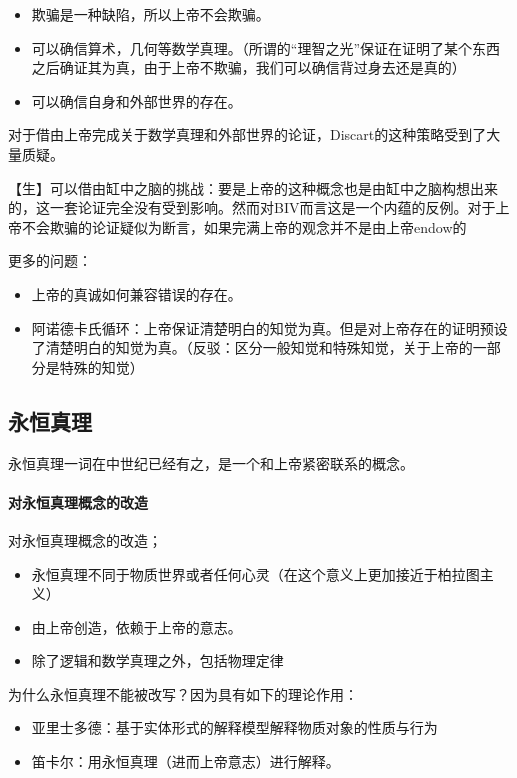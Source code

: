 \documentclass{ctexart}
\begin{document}
\begin{itemize}
    \item 欺骗是一种缺陷，所以上帝不会欺骗。
    \item 可以确信算术，几何等数学真理。（所谓的“理智之光”保证在证明了某个东西之后确证其为真，由于上帝不欺骗，我们可以确信背过身去还是真的）
    \item 可以确信自身和外部世界的存在。
\end{itemize}

对于借由上帝完成关于数学真理和外部世界的论证，Discart的这种策略受到了大量质疑。

【生】可以借由缸中之脑的挑战：要是上帝的这种概念也是由缸中之脑构想出来的，这一套论证完全没有受到影响。然而对BIV而言这是一个内蕴的反例。对于上帝不会欺骗的论证疑似为断言，如果完满上帝的观念并不是由上帝endow的

更多的问题：

\begin{itemize}
    \item 上帝的真诚如何兼容错误的存在。
    \item 阿诺德卡氏循环：上帝保证清楚明白的知觉为真。但是对上帝存在的证明预设了清楚明白的知觉为真。（反驳：区分一般知觉和特殊知觉，关于上帝的一部分是特殊的知觉）
\end{itemize}

\subsection{永恒真理}

永恒真理一词在中世纪已经有之，是一个和上帝紧密联系的概念。

\paragraph{对永恒真理概念的改造}

对永恒真理概念的改造；

\begin{itemize}
    \item 永恒真理不同于物质世界或者任何心灵（在这个意义上更加接近于柏拉图主义）
    \item 由上帝创造，依赖于上帝的意志。
    \item 除了逻辑和数学真理之外，包括物理定律
\end{itemize}

为什么永恒真理不能被改写？因为具有如下的理论作用：

\begin{itemize}
    \item 亚里士多德：基于实体形式的解释模型解释物质对象的性质与行为
    \item 笛卡尔：用永恒真理（进而上帝意志）进行解释。
\end{itemize}
\end{document}
